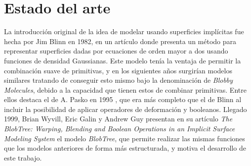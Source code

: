 \chapter{Estado del arte}\label{sec:arte}
La introducción original de la idea de modelar usando superficies implícitas fue hecha por Jim Blinn en 1982, en un artículo \cite{blinn1982generalization} donde presenta un método para representar superficies dadas por ecuaciones de orden mayor a dos usando funciones de densidad Gaussianas. Este modelo tenía la ventaja de permitir la combinación suave de primitivas, y en los siguientes años surgirían modelos similares tratando de conseguir esto mismo bajo la denominación de \textit{Blobby Molecules}, debido a la capacidad que tienen estos de combinar primitivas. Entre ellos destaca el de A. Pasko en 1995 \cite{pasko1995function}, que era más completo que el de Blinn al incluir la posibilidad de aplicar operadores de deformación y booleanos. Llegado 1999, Brian Wyvill, Eric Galin y Andrew Guy presentan en su artículo \textit{The BlobTree: Warping, Blending and Boolean Operations in an Implicit Surface Modeling System} \cite{blobtree} el modelo \textit{BlobTree}, que permite realizar las mismas funciones que los modelos anteriores de forma más estructurada, y motiva el desarrollo de este trabajo.\newline

